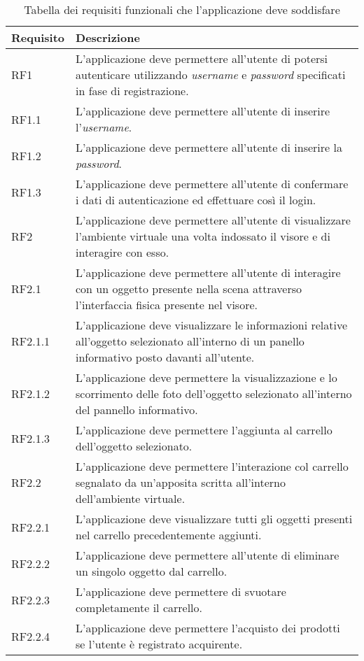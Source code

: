 \begin{table}
	\centering
	\label{my-label}
	\begin{tabular}{| l | p{10cm} |}
		\hline
		\textbf{Requisito} & \textbf{Descrizione} \\ \hline
		RF1 & L'applicazione deve permettere all'utente di potersi autenticare utilizzando \textit{username} e \textit{password} specificati in fase di registrazione. \\ \hline
		RF1.1 & L'applicazione deve permettere all'utente di inserire l'\textit{username}. \\ \hline
		RF1.2 & L'applicazione deve permettere all'utente di inserire la \textit{password}. \\ \hline
		RF1.3 & L'applicazione deve permettere all'utente di confermare i dati di autenticazione ed effettuare così il login. \\ \hline
		RF2 & L'applicazione deve permettere all'utente di visualizzare l'ambiente virtuale una volta indossato il visore e di interagire con esso. \\ \hline
		RF2.1 & L'applicazione deve permettere all'utente di interagire con un oggetto presente nella scena attraverso l'interfaccia fisica presente nel visore. \\ \hline
		RF2.1.1 & L'applicazione deve visualizzare le informazioni relative all'oggetto selezionato all'interno di un panello informativo posto davanti all'utente. \\ \hline
		RF2.1.2 & L'applicazione deve permettere la visualizzazione e lo scorrimento delle foto dell'oggetto selezionato all'interno del pannello informativo. \\ \hline
		RF2.1.3 & L'applicazione deve permettere l'aggiunta al carrello dell'oggetto selezionato. \\ \hline
		RF2.2 & L'applicazione deve permettere l'interazione col carrello segnalato da un'apposita scritta all'interno dell'ambiente virtuale. \\ \hline
		RF2.2.1 & L'applicazione deve visualizzare tutti gli oggetti presenti nel carrello precedentemente aggiunti. \\ \hline
		RF2.2.2 & L'applicazione deve permettere all'utente di eliminare un singolo oggetto dal carrello. \\ \hline
		RF2.2.3 & L'applicazione deve permettere di svuotare completamente il carrello. \\ \hline
		RF2.2.4 & L'applicazione deve permettere l'acquisto dei prodotti se l'utente è registrato acquirente. \\ 
		\hline
	\end{tabular}
	\caption{Tabella dei requisiti funzionali che l'applicazione deve soddisfare}
\end{table}
\FloatBarrier

